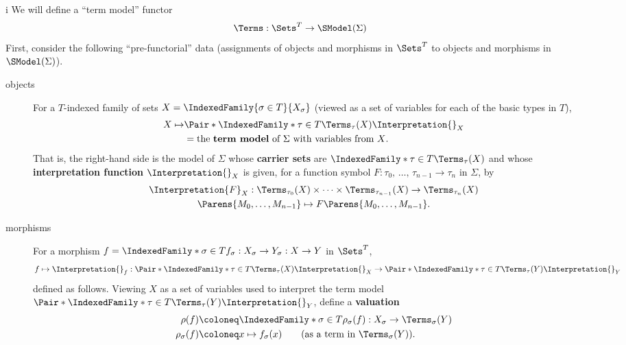 \begin{partsolution}{i}
We will define a ``term model'' functor
\begin{equation*}
\Terms : \Sets^T \to \SModel(\Sigma)
\end{equation*}
First, consider the following ``pre-functorial'' data (assignments of objects and morphisms in \(\Sets^T\) to objects and morphisms in \(\SModel(\Sigma)\)).
\begin{description}
\item[objects]
For a \(T\)-indexed family of sets \(X = \IndexedFamily{\sigma \in T}{X_\sigma}\) (viewed as a set of variables for each of the basic types in \(T\)),
\begin{align*}
X \mapsto & \Pair*{\IndexedFamily*{\tau \in T}{\Terms_\tau(X)}}{\Interpretation{}_X} \\
&= \text{the \textbf{term model} of \(\Sigma\) with variables from \(X\)}.
\end{align*}
That is, the right-hand side is the model of \(\Sigma\) whose \textbf{carrier sets} are \(\IndexedFamily*{\tau \in T}{\Terms_\tau(X)}\) and whose \textbf{interpretation function} \(\Interpretation{}_X\) is given, for a function symbol \(F : \tau_0,\,\ldots,\,\tau_{n-1} \to \tau_n\) in \(\Sigma\), by
\begin{gather*}
\Interpretation{F}_X : \Terms_{\tau_0}(X) \times \cdots \times \Terms_{\tau_{n-1}}(X) \to \Terms_{\tau_n}(X) \\
\Parens{M_0, \ldots, M_{n-1}} \mapsto F\Parens{M_0, \ldots, M_{n-1}}.
\end{gather*}
\item[morphisms]
For a morphism \(f = \IndexedFamily*{\sigma \in T}{f_\sigma : X_\sigma \to Y_\sigma} : X \to Y\) in \(\Sets^T\),
\begin{equation*}
f \mapsto \Interpretation{}_f : \Pair*{\IndexedFamily*{\tau \in T}{\Terms_\tau(X)}}{\Interpretation{}_X} \to \Pair*{\IndexedFamily*{\tau \in T}{\Terms_\tau(Y)}}{\Interpretation{}_Y}
\end{equation*}
defined as follows.
Viewing \(X\) as a set of variables used to interpret the term model \(\Pair*{\IndexedFamily*{\tau \in T}{\Terms_\tau(Y)}}{\Interpretation{}_Y}\), define a \textbf{valuation}
\begin{align*}
\rho(f) &\coloneq \IndexedFamily*{\sigma \in T}{\rho_\sigma(f) : X_\sigma \to \Terms_\sigma(Y)} \\
\rho_\sigma(f) &\coloneq x \mapsto f_\sigma(x) \qquad\text{(as a term in \(\Terms_\sigma(Y)\))}.
\end{align*}

\end{description}
\end{partsolution}
